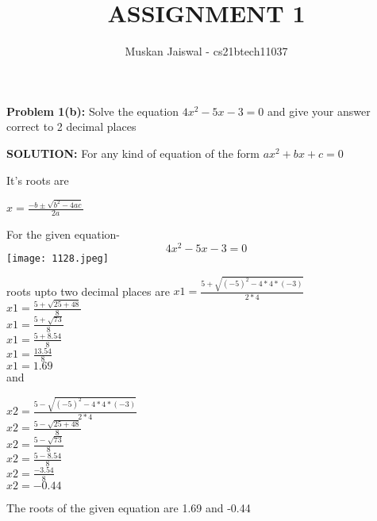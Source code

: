 \documentclass[journal,12pt,two column]{IEEEtran}
\title{ASSIGNMENT 1 }
\author{Muskan Jaiswal - cs21btech11037}
\begin{document}
\maketitle
\textbf{Problem 1(b):} Solve the equation $4x^2-5x-3=0$ and give your answer correct to 2 decimal places
\bigskip

\textbf{SOLUTION:}     For any kind of equation of the form  $ax^2+bx+c=0$

It's roots are

$x=\frac{-b\pm\sqrt{b^2-4ac}}{2a}$

For the given equation-
\begin{equation}
    4x^2-5x-3=0
\end{equation}
\texttt{[image: 1128.jpeg]}

roots upto two decimal places are
$x1=\frac{5+\sqrt{(-5)^2-4*4*(-3)}}{2*4}
$\\


$x1=\frac{5+\sqrt{25+48}}{8}
$
\\
$x1=\frac{5+\sqrt{73}}{8}
$
\\
$x1=\frac{5+8.54}{8}
$ \\

$x1=\frac{13.54}{8}
$
\\
$ x1=1.69
  $\\


and

$x2=\frac{5-\sqrt{(-5)^2-4*4*(-3)}}{2*4}
$\\

$x2=\frac{5-\sqrt{25+48}}{8}
$\\

$x2=\frac{5-\sqrt{73}}{8}
$\\

$x2=\frac{5-8.54}{8} $\\

$x2=\frac{-3.54}{8} $\\

$x2=-0.44
$
\bigskip

The roots of the given equation are 1.69 and -0.44
\end{document}
